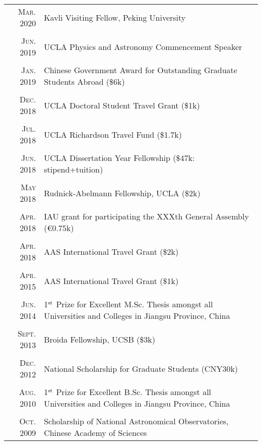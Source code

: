\documentclass[letterpaper,12pt]{article}
\newcommand{\narrow}{-1.6ex}
\newcommand{\textwrap}{5.3in}       %
\begin{document}
\vspace*{-.5em}
\begin{longtable}{r|p{\textwrap}}

    \textsc{Mar. 2020} & Kavli Visiting Fellow, Peking University \\
    \multicolumn{2}{c}{} \\[\narrow]
    \textsc{Jun. 2019} & UCLA Physics and Astronomy Commencement Speaker  \\
    \multicolumn{2}{c}{} \\[\narrow]
    \textsc{Jan. 2019} & Chinese Government Award for Outstanding Graduate Students Abroad (\$6k)   \\
    \multicolumn{2}{c}{} \\[\narrow]
    \textsc{Dec. 2018} & UCLA Doctoral Student Travel Grant (\$1k)   \\
    \multicolumn{2}{c}{} \\[\narrow]
    \textsc{Jul. 2018} & UCLA Richardson Travel Fund (\$1.7k)   \\
    \multicolumn{2}{c}{} \\[\narrow]
    \textsc{Jun. 2018} & UCLA Dissertation Year Fellowship (\$47k: stipend+tuition)    \\
    \multicolumn{2}{c}{} \\[\narrow]
    \textsc{May 2018} & Rudnick-Abelmann Fellowship, UCLA (\$2k)      \\
    \multicolumn{2}{c}{} \\[\narrow]
    \textsc{Apr. 2018} & IAU grant for participating the XXXth General Assembly (\euro0.75k)  \\
    \multicolumn{2}{c}{} \\[\narrow]
    \textsc{Apr. 2018} & AAS International Travel Grant (\$2k)    \\
    \multicolumn{2}{c}{} \\[\narrow]
    \textsc{Apr. 2015} & AAS International Travel Grant (\$1k)    \\
    \multicolumn{2}{c}{} \\[\narrow]
    \textsc{Jun. 2014} & 1$^{\rm st}$ Prize for Excellent M.Sc. Thesis amongst all Universities and Colleges in Jiangsu Province, China   \\
    \multicolumn{2}{c}{} \\[\narrow]
    \textsc{Sept. 2013} & Broida Fellowship, UCSB (\$3k)  \\
    \multicolumn{2}{c}{} \\[\narrow]
    \textsc{Dec. 2012} & National Scholarship for Graduate Students (CNY30k)  \\
    \multicolumn{2}{c}{} \\[\narrow]
    \textsc{Aug. 2010} & 1$^{\rm st}$ Prize for Excellent B.Sc. Thesis amongst all Universities and Colleges in Jiangsu Province, China   \\
    \multicolumn{2}{c}{} \\[\narrow]
    \textsc{Oct. 2009} & Scholarship of National Astronomical Observatories, Chinese Academy of Sciences
\end{longtable}
\end{document}
